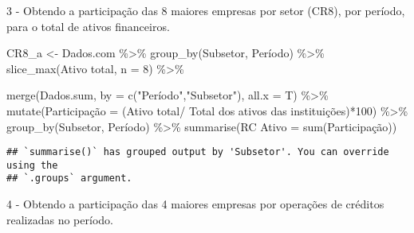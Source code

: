 \documentclass[
]{article}
\newenvironment{Shaded}{\begin{snugshade}}{\end{snugshade}}
\newcommand{\AttributeTok}[1]{\textcolor[rgb]{0.77,0.63,0.00}{#1}}
\newcommand{\DecValTok}[1]{\textcolor[rgb]{0.00,0.00,0.81}{#1}}
\newcommand{\FunctionTok}[1]{\textcolor[rgb]{0.00,0.00,0.00}{#1}}
\newcommand{\NormalTok}[1]{#1}
\newcommand{\OtherTok}[1]{\textcolor[rgb]{0.56,0.35,0.01}{#1}}
\newcommand{\SpecialCharTok}[1]{\textcolor[rgb]{0.00,0.00,0.00}{#1}}
\newcommand{\StringTok}[1]{\textcolor[rgb]{0.31,0.60,0.02}{#1}}
\begin{document}
3 - Obtendo a participação das 8 maiores empresas por setor (CR8), por
período, para o total de ativos financeiros.

\begin{Shaded}
\begin{Highlighting}[]
\NormalTok{CR8\_a }\OtherTok{\textless{}{-}}\NormalTok{ Dados.com }\SpecialCharTok{\%\textgreater{}\%} 
  \FunctionTok{group\_by}\NormalTok{(Subsetor, Período) }\SpecialCharTok{\%\textgreater{}\%} 
  \FunctionTok{slice\_max}\NormalTok{(}\StringTok{\textasciigrave{}}\AttributeTok{Ativo total}\StringTok{\textasciigrave{}}\NormalTok{, }\AttributeTok{n =} \DecValTok{8}\NormalTok{) }\SpecialCharTok{\%\textgreater{}\%}
  
  \FunctionTok{merge}\NormalTok{(Dados.sum, }\AttributeTok{by =} \FunctionTok{c}\NormalTok{(}\StringTok{"Período"}\NormalTok{,}\StringTok{"Subsetor"}\NormalTok{), }\AttributeTok{all.x =}\NormalTok{ T) }\SpecialCharTok{\%\textgreater{}\%}
  \FunctionTok{mutate}\NormalTok{(Participação }\OtherTok{=}\NormalTok{ (}\StringTok{\textasciigrave{}}\AttributeTok{Ativo total}\StringTok{\textasciigrave{}}\SpecialCharTok{/}
                         \StringTok{\textasciigrave{}}\AttributeTok{Total dos ativos das instituições}\StringTok{\textasciigrave{}}\NormalTok{)}\SpecialCharTok{*}\DecValTok{100}\NormalTok{) }\SpecialCharTok{\%\textgreater{}\%}
  \FunctionTok{group\_by}\NormalTok{(Subsetor, Período) }\SpecialCharTok{\%\textgreater{}\%}
  \FunctionTok{summarise}\NormalTok{(}\StringTok{\textasciigrave{}}\AttributeTok{RC Ativo}\StringTok{\textasciigrave{}} \OtherTok{=} \FunctionTok{sum}\NormalTok{(Participação))}
\end{Highlighting}
\end{Shaded}

\begin{verbatim}
## `summarise()` has grouped output by 'Subsetor'. You can override using the
## `.groups` argument.
\end{verbatim}

4 - Obtendo a participação das 4 maiores empresas por operações de
créditos realizadas no período.
\end{document}
